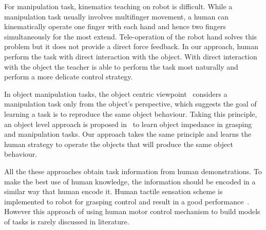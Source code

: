 For manipulation task, kinematics teaching on robot is difficult. While a manipulation task usually involves multifinger movement, a human can kinematically operate one finger with each hand and hence two fingers simultaneously for the most extend. Tele-operation of the robot hand solves this problem but it does not provide a direct force feedback. In our approach, human perform the task with direct interaction with the object. With direct interaction with the object the teacher is able to perform the task most naturally and perform a more delicate control strategy. %

In object manipulation tasks, the object centric viewpoint~\cite{okamura2000overview} considers a manipulation task only from the object's perspective, which suggests the goal of learning a task is to reproduce the same object behaviour. Taking this principle, an object level approach is proposed in~\cite{Miao2014} to learn object impedance in grasping and manipulation tasks. Our approach takes the same principle and learns the human strategy to operate the objects that will produce the same object behaviour.

All the these approaches obtain task information from human demonstrations. To make the best use of human knowledge, the information should be encoded in a similar way that human encode it. Human tactile sensation scheme is implemented to robot for grasping control and result in a good performance~\cite{romano2011human}. However this approach of using human motor control mechanism to build models of tasks is rarely discussed in literature.





